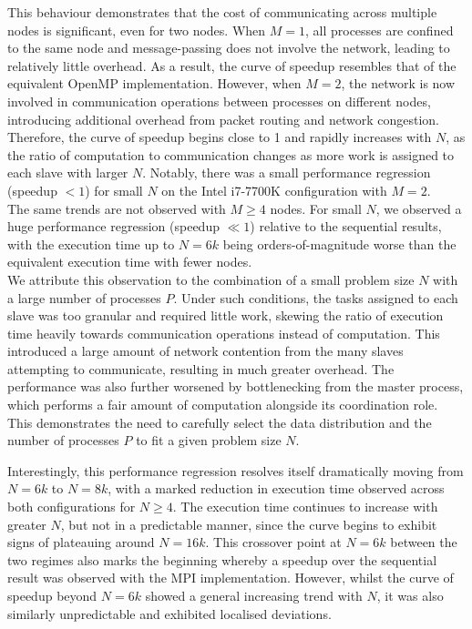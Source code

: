 \documentclass[12pt]{article}
\begin{document}
This behaviour demonstrates that the cost of communicating across multiple nodes is significant, even for two nodes. When $M = 1$, all processes are confined to the same node and message-passing does not involve the network, leading to relatively little overhead. As a result, the curve of speedup resembles that of the equivalent OpenMP implementation. However, when $M = 2$, the network is now involved in communication operations between processes on different nodes, introducing additional overhead from packet routing and network congestion. Therefore, the curve of speedup begins close to 1 and rapidly increases with $N$, as the ratio of computation to communication changes as more work is assigned to each slave with larger $N$. Notably, there was a small performance regression (speedup $< 1$) for small $N$ on the Intel i7-7700K configuration with $M = 2$.\\

The same trends are not observed with $M \geq 4$ nodes. For small $N$, we observed a huge performance regression (speedup $\ll 1$) relative to the sequential results, with the execution time up to $N = 6k$ being orders-of-magnitude worse than the equivalent execution time with fewer nodes.\\

We attribute this observation to the combination of a small problem size $N$ with a large number of processes $P$. Under such conditions, the tasks assigned to each slave was too granular and required little work, skewing the ratio of execution time heavily towards communication operations instead of computation. This introduced a large amount of network contention from the many slaves attempting to communicate, resulting in much greater overhead. The performance was also further worsened by bottlenecking from the master process, which performs a fair amount of computation alongside its coordination role. This demonstrates the need to carefully select the data distribution and the number of processes $P$ to fit a given problem size $N$.

\pagebreak

Interestingly, this performance regression resolves itself dramatically moving from $N = 6k$ to $N = 8k$, with a marked reduction in execution time observed across both configurations for $N \geq 4$. The execution time continues to increase with greater $N$, but not in a predictable manner, since the curve begins to exhibit signs of plateauing around $N = 16k$. This crossover point at $N = 6k$ between the two regimes also marks the beginning whereby a speedup over the sequential result was observed with the MPI implementation. However, whilst the curve of speedup beyond $N = 6k$ showed a general increasing trend with $N$, it was also similarly unpredictable and exhibited localised deviations.\\
\end{document}
